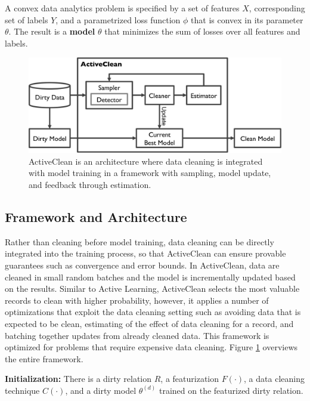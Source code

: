 \begin{definition}
A convex data analytics problem is specified by a set of features $X$, corresponding set of labels $Y$, and a parametrized loss function $\phi$ that is convex in its parameter $\theta$.
The result is a \textbf{model} $\theta$ that minimizes the sum of losses over all features and labels.
\end{definition}

\begin{figure}[t]
\centering
 \includegraphics[width=0.5\columnwidth]{figs/arch2.png}
 \caption{ActiveClean is an architecture where data cleaning is integrated with model training in a framework with sampling, model update, and feedback through estimation. \label{sys-arch}}\vspace{-2em}
\end{figure}

\subsection{Framework and Architecture}
Rather than cleaning before model training, data cleaning can be directly integrated into the training process, so that ActiveClean can ensure provable guarantees such as convergence and error bounds.
In ActiveClean, data are cleaned in small random batches and the model is incrementally updated based on the results.
Similar to Active Learning, ActiveClean selects the most valuable records to clean with higher probability, however, it applies a number of optimizations that exploit the data cleaning setting such as avoiding data that is expected to be clean, estimating of the effect of data cleaning for a record, and batching together updates from already cleaned data.
This framework is optimized for problems that require expensive data cleaning.
Figure \ref{sys-arch} overviews the entire framework.

\noindent\textbf{Initialization: } There is a dirty relation $R$, a featurization $F(\cdot)$, a data cleaning technique $C(\cdot)$, and a dirty model $\theta^{(d)}$ trained on the featurized dirty relation.

\vspace{0.5em}

